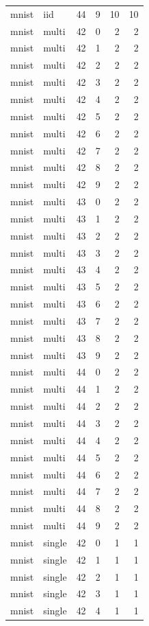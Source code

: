 \begin{tabular}{llrrrr}
mnist & iid & 44 & 9 & 10 & 10 \\
mnist & multi & 42 & 0 & 2 & 2 \\
mnist & multi & 42 & 1 & 2 & 2 \\
mnist & multi & 42 & 2 & 2 & 2 \\
mnist & multi & 42 & 3 & 2 & 2 \\
mnist & multi & 42 & 4 & 2 & 2 \\
mnist & multi & 42 & 5 & 2 & 2 \\
mnist & multi & 42 & 6 & 2 & 2 \\
mnist & multi & 42 & 7 & 2 & 2 \\
mnist & multi & 42 & 8 & 2 & 2 \\
mnist & multi & 42 & 9 & 2 & 2 \\
mnist & multi & 43 & 0 & 2 & 2 \\
mnist & multi & 43 & 1 & 2 & 2 \\
mnist & multi & 43 & 2 & 2 & 2 \\
mnist & multi & 43 & 3 & 2 & 2 \\
mnist & multi & 43 & 4 & 2 & 2 \\
mnist & multi & 43 & 5 & 2 & 2 \\
mnist & multi & 43 & 6 & 2 & 2 \\
mnist & multi & 43 & 7 & 2 & 2 \\
mnist & multi & 43 & 8 & 2 & 2 \\
mnist & multi & 43 & 9 & 2 & 2 \\
mnist & multi & 44 & 0 & 2 & 2 \\
mnist & multi & 44 & 1 & 2 & 2 \\
mnist & multi & 44 & 2 & 2 & 2 \\
mnist & multi & 44 & 3 & 2 & 2 \\
mnist & multi & 44 & 4 & 2 & 2 \\
mnist & multi & 44 & 5 & 2 & 2 \\
mnist & multi & 44 & 6 & 2 & 2 \\
mnist & multi & 44 & 7 & 2 & 2 \\
mnist & multi & 44 & 8 & 2 & 2 \\
mnist & multi & 44 & 9 & 2 & 2 \\
mnist & single & 42 & 0 & 1 & 1 \\
mnist & single & 42 & 1 & 1 & 1 \\
mnist & single & 42 & 2 & 1 & 1 \\
mnist & single & 42 & 3 & 1 & 1 \\
mnist & single & 42 & 4 & 1 & 1 \\

\end{tabular}
